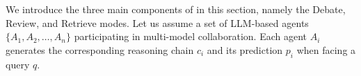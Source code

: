 \section{\crraw}


We introduce the three main components of \ours in this section, 
namely the Debate, Review, and Retrieve modes.
Let us assume a set of LLM-based agents $\{A_1, A_2, \dots, A_n\}$ participating in multi-model collaboration.
Each agent $A_i$ generates the corresponding reasoning chain $c_i$ and its prediction $p_i$ when facing a query $q$.







